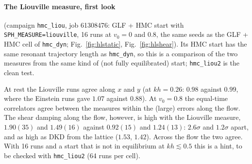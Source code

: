 \documentclass[11pt,aps,preprint,nofootinbib,superscriptaddress,tightenlines]{revtex4-2}
\def\Fig#1{Fig.~\ref{#1}}
\let\oldparagraph\paragraph
\renewcommand{\paragraph}{\par\bigskip\oldparagraph}
\begin{document}
\paragraph{The Liouville measure, first look} (campaign \texttt{hmc\_liou}, job 61308476: GLF + HMC start with \texttt{SPH\_MEASURE=liouville}, 16 runs at
$v_0=0$ and $0.8$, the same seeds as the GLF + HMC cell of \texttt{hmc\_dyn}; \Fig{fig:hlstatic}, \Fig{fig:hlshear}).  Its HMC start has the same
resonant trajectory length as \texttt{hmc\_dyn}, so this is a comparison of the two measures from the same kind of (not fully
equilibrated) start; \texttt{hmc\_liou2} is the clean test.
\begin{center}
\end{center}
At rest the Liouville runs agree along $x$ and $y$ (at $kh=0.26$: $0.98$ against $0.99$, where the Einstein runs gave $1.07$ against $0.88$).
At $v_0=0.8$ the equal-time correlators agree between the measures within the (large) errors along the flow.  The shear damping along
the flow, however, is high with the Liouville measure, $1.90(35)$ and $1.49(16)$ against $0.92(15)$ and $1.24(13)$: $2.6\sigma$ and $1.2\sigma$ apart,
and as high as DKD from the lattice ($1.53$, $1.42$).  Across the flow the two agree.  With 16 runs and a start that is not in equilibrium
at $kh\lesssim0.5$ this is a hint, to be checked with \texttt{hmc\_liou2} (64 runs per cell).
\end{document}
